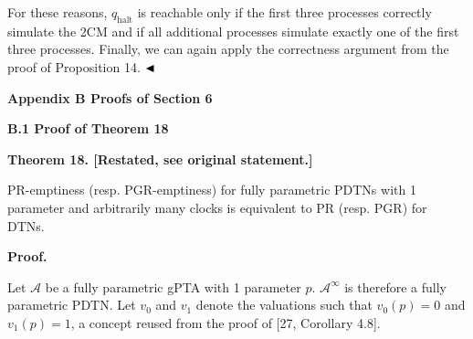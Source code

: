 For these reasons, $q_{\textrm{halt}}$ is reachable only if the first three processes correctly simulate the 2CM and if all additional processes simulate exactly one of the first three processes. Finally, we can again apply the correctness argument from the proof of Proposition 14. $\hfill\blacktriangleleft$\par
 
 
 
 


 
\par\medskip\noindent\textbf{Appendix B Proofs of Section 6}\par
 
 
\par\medskip\noindent\textbf{B.1 Proof of Theorem 18}\par
 
 
 
\par\medskip\noindent\textbf{Theorem 18. [Restated, see original statement.]}\par
 
 
PR-emptiness (resp. PGR-emptiness) for fully parametric PDTNs with 1 parameter and arbitrarily many clocks is equivalent to PR (resp. PGR) for DTNs.\par
 
 
 
 
 
\par\medskip\noindent\textbf{Proof.}\par
 
 
Let $\mathcal{A}$ be a fully parametric gPTA with 1 parameter $p$. ${\mathcal{A}}^{\infty}$ is therefore a fully parametric PDTN. Let $v_{0}$ and $v_{1}$ denote the valuations such that $v_{0}(p)=0$ and $v_{1}(p)=1$, a concept reused from the proof of [27, Corollary 4.8].\par
 
 

